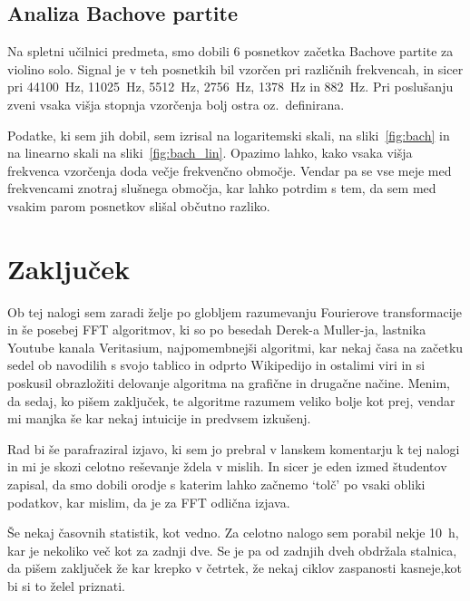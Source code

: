 \documentclass{porocilo}
\begin{document}


\subsection{Analiza Bachove partite}
Na spletni učilnici predmeta, smo dobili 6 posnetkov začetka Bachove partite za violino solo. Signal je v teh posnetkih bil vzorčen pri različnih frekvencah, in sicer pri \SI{44100}{Hz}, \SI{11025}{Hz}, \SI{5512}{Hz}, \SI{2756}{Hz}, \SI{1378}{Hz} in \SI{882}{Hz}. Pri poslušanju zveni vsaka višja stopnja vzorčenja bolj ostra oz.~definirana.

Podatke, ki sem jih dobil, sem izrisal na logaritemski skali, na sliki~\ref{fig:bach} in na linearno skali na sliki~\ref{fig:bach_lin}. Opazimo lahko, kako vsaka višja frekvenca vzorčenja doda večje frekvenčno območje. Vendar pa se vse meje med frekvencami znotraj slušnega območja, kar lahko potrdim s tem, da sem med vsakim parom posnetkov slišal občutno razliko.



\newpage
\section{Zaključek}
Ob tej nalogi sem zaradi želje po globljem razumevanju Fourierove transformacije in še posebej FFT algoritmov, ki so po besedah Derek-a Muller-ja, lastnika Youtube kanala Veritasium, najpomembnejši algoritmi, kar nekaj časa na začetku sedel ob navodilih s svojo tablico in odprto Wikipedijo in ostalimi viri in si poskusil obrazložiti delovanje algoritma na grafične in drugačne načine. Menim, da sedaj, ko pišem zaključek, te algoritme razumem veliko bolje kot prej, vendar mi manjka še kar nekaj intuicije in predvsem izkušenj.

Rad bi še parafraziral izjavo, ki sem jo prebral v lanskem komentarju k tej nalogi in mi je skozi celotno reševanje ždela v mislih. In sicer je eden izmed študentov zapisal, da smo dobili orodje s katerim lahko začnemo `tolč' po vsaki obliki podatkov, kar mislim, da je za FFT odlična izjava.

Še nekaj časovnih statistik, kot vedno. Za celotno nalogo sem porabil nekje \SI{10}{\hour}, kar je nekoliko več kot za zadnji dve. Se je pa od zadnjih dveh obdržala stalnica, da pišem zaključek že kar krepko v četrtek, že nekaj ciklov zaspanosti kasneje,kot bi si to želel priznati.
\end{document}
